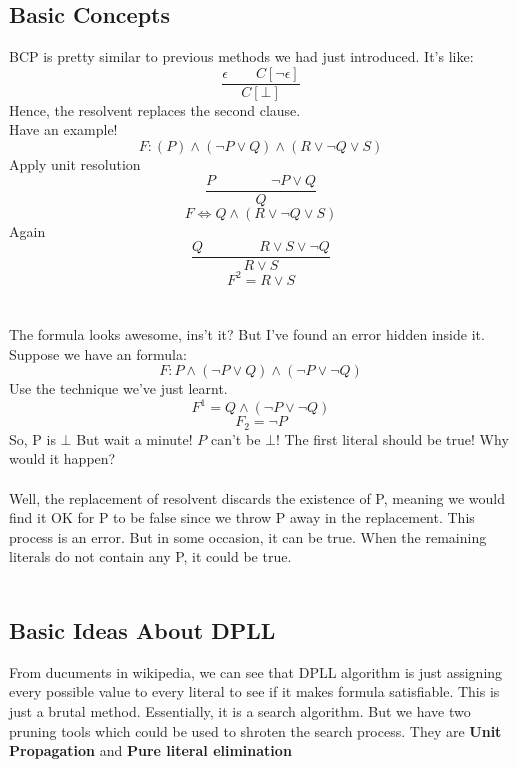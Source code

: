 \documentclass{article}
\begin{document}
\subsection{Basic Concepts}
BCP is pretty similar to previous methods we had just introduced. It's like:
$$\frac{\epsilon \qquad C[\neg \epsilon]}{C[\bot]}$$    
Hence, the resolvent replaces the second clause.\\
Have an example!
$$F: (P) \land (\neg P \lor Q) \land (R \lor \neg Q \lor S)$$
Apply unit resolution
$$\frac{P\qquad \qquad \neg P \lor Q}{Q}$$
$$F \iff Q \land (R \lor \neg Q \lor S)$$
Again $$\frac{Q\qquad \qquad R \lor S \lor \neg Q}{R \lor S}$$
$$F^2 = R \lor S$$\\\\
The formula looks awesome, ins't it? But I've found an error hidden inside it. Suppose we have an formula:
$$F: P \land (\neg P \lor Q) \land (\neg P \lor \neg Q)$$
Use the technique we've just learnt.
$$F^1 = Q \land (\neg P \lor \neg Q)$$
$$F_2 = \neg P$$
So, P is $\bot$
But wait a minute! $P$ can't be $\bot$! The first literal should be true! Why would it happen?\\\\
Well, the replacement of resolvent discards the existence of P, meaning we would find it OK for P to be false since we throw P away in the replacement. This process is an error. But in some occasion, it can be true. When the remaining literals do not contain any P, it could be true.\\\\

\subsection{Basic Ideas About DPLL}
From ducuments in wikipedia, we can see that DPLL algorithm is just assigning every possible value to every literal to see if it makes formula satisfiable. This is just a brutal method. Essentially, it is a search algorithm. But we have two pruning tools which could be used to shroten the search process. They are \textbf{Unit Propagation} and \textbf{Pure literal elimination}\\\\
\end{document}
